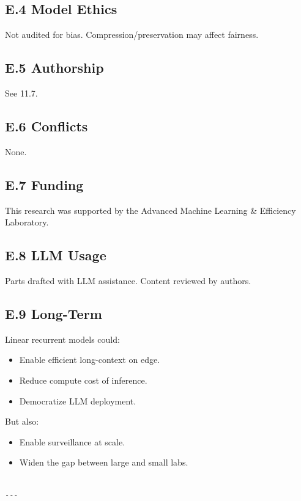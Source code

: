 \subsection{E.4 Model Ethics}

Not audited for bias. Compression/preservation may affect fairness.

\subsection{E.5 Authorship}

See  11.7.

\subsection{E.6 Conflicts}

None.

\subsection{E.7 Funding}

This research was supported by the Advanced Machine Learning & Efficiency Laboratory.

\subsection{E.8 LLM Usage}

Parts drafted with LLM assistance. Content reviewed by authors.

\subsection{E.9 Long-Term}

Linear recurrent models could:
\begin{itemize}
\item Enable efficient long-context on edge.
\item Reduce compute cost of inference.
\item Democratize LLM deployment.

\end{itemize}
But also:
\begin{itemize}
\item Enable surveillance at scale.
\item Widen the gap between large and small labs.
\end{itemize}
\begin{lstlisting}

---
\end{lstlisting}